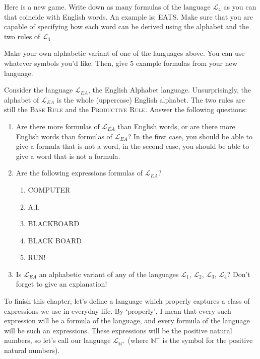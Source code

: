 \begin{exc}
Here is a new game. Write down as many formulas of the language $\mathcal{L}_4$ as you can that coincide with English words. An example is: EATS. Make sure that you are capable of specifying how each word can be derived using the alphabet and the two rules of $\mathcal{L}_4$
\end{exc}

\begin{exc}
Make your own alphabetic variant of one of the languages above. You can use whatever symbols you'd like. Then, give 5 example formulas from your new language. 
\end{exc}

\begin{exc}
Consider the language $\mathcal{L}_{EA}$, the English Alphabet language. Unsurprisingly, the alphabet of $\mathcal{L}_{EA}$ is the whole (uppercase) English alphabet. The two rules are still the \textsc{Base Rule} and the \textsc{Productive Rule}. Answer the following questions:

\begin{enumerate}
	\item Are there more formulas of $\mathcal{L}_{EA}$ than English words, or are there more English words than formulas of $\mathcal{L}_{EA}$? In the first case, you should be able to give a formula that is not a word, in the second case, you should be able to give a word that is not a formula. 
	\item Are the following expressions formulas of $\mathcal{L}_{EA}$?
		\begin{enumerate}
			\item COMPUTER
			\item A.I.
			\item BLACKBOARD
			\item BLACK BOARD
			\item RUN!
		\end{enumerate}
	\item Is $\mathcal{L}_{EA}$ an alphabetic variant of any of the languages $\mathcal{L}_1$, $\mathcal{L}_2$, $\mathcal{L}_3$, $\mathcal{L}_4$? Don't forget to give an explanation!
\end{enumerate}
\end{exc}

To finish this chapter, let's define a language which properly captures a class of expressions we use in everyday life. By `properly', I mean that every such expression will be a formula of the language, and every formula of the language will be such an expressions. These expressions will be the positive natural numbers, so let's call our language $\mathcal{L}_{\mathbb{N}^+}$ (where ${\mathbb{N}^+}$ is the symbol for the positive natural numbers).

